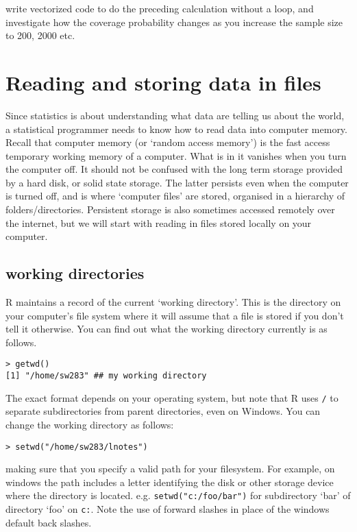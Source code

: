 \documentclass[10pt] {article}
\theoremstyle{definition}
\begin{document}
 write vectorized code to do the preceding calculation without a loop, and investigate how the coverage probability changes as you increase the sample size to 200, 2000 etc.


\section{Reading and storing data in files}

Since statistics is about understanding what data are telling us about the world, a statistical programmer needs to know how to read data into computer memory. Recall that computer memory (or `random access memory') is the fast access temporary working memory of a computer. What is in it vanishes when you turn the computer off. It should not be confused with the long term storage provided by a hard disk, or solid state storage. The latter persists even when the computer is turned off, and is where `computer files' are stored, organised in a hierarchy of folders/directories. Persistent storage is also sometimes accessed remotely over the internet, but we will start with reading in files stored locally on your computer. 

\subsection{working directories}

R maintains a record of the current `working directory'. This is the directory on your computer's file system where it will assume that a file is stored if you don't tell it otherwise. You can find out what the working directory currently is as follows. 
\begin{lstlisting}
> getwd()
[1] "/home/sw283" ## my working directory
\end{lstlisting}
The exact format depends on your operating system, but note that R uses \verb+/+ to separate subdirectories from parent directories, even on Windows. You can change the working directory as follows:
\begin{lstlisting}
> setwd("/home/sw283/lnotes")
\end{lstlisting}
making sure that you specify a valid path for your filesystem. For example, on windows the path includes a letter identifying the disk or other storage device where the directory is located. e.g. \lstinline+setwd("c:/foo/bar")+ for subdirectory `bar' of directory `foo' on \verb+c:+. Note the use of forward slashes in place of the windows default back slashes.
\end{document}
